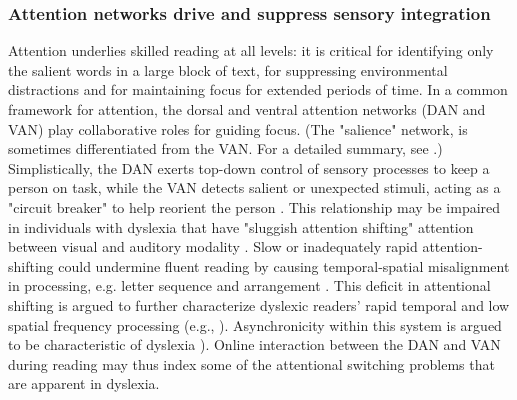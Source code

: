 \subsubsection{Attention networks drive and suppress sensory integration} 
Attention underlies skilled reading at all levels: it is critical for identifying only the salient words in a large block of text, for suppressing environmental distractions and for maintaining focus for extended periods of time. In a common framework for attention, the dorsal and ventral attention networks (DAN and VAN) play collaborative roles for guiding focus. (The "salience" network, is sometimes differentiated from the VAN. For a detailed summary, see \cite{...}.) Simplistically, the DAN exerts top-down control of sensory processes to keep a person on task, while the VAN detects salient or unexpected stimuli, acting as a "circuit breaker" to help reorient the person \cite{Corbetta2002, Vossel2014}. This relationship may be impaired in individuals with dyslexia that have "sluggish attention shifting" attention between visual and auditory modality \cite{Harrar2014}. Slow or inadequately rapid attention-shifting could undermine fluent reading by causing temporal-spatial misalignment in processing, e.g. letter sequence and arrangement \cite{Lallier2009}. This deficit in attentional shifting is argued to further characterize dyslexic readers’ rapid temporal and low spatial frequency processing (e.g., \cite{Ingelhem2001, Witton1998}). Asynchronicity within this system is argued to be characteristic of dyslexia \cite{Vidyasagar2009, Lallier2009, Ingelhem2001}). Online interaction between the DAN and VAN during reading may thus index some of the attentional switching problems that are apparent in dyslexia. 

